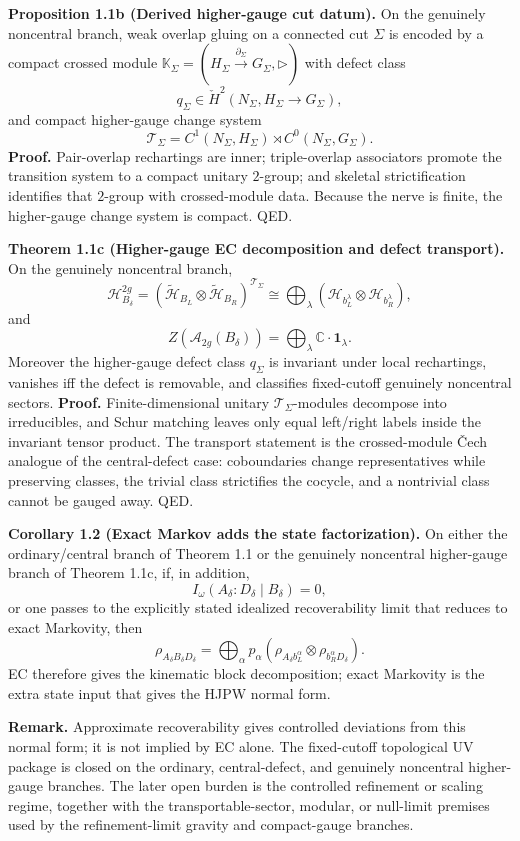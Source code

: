 \textbf{Proposition 1.1b (Derived higher-gauge cut datum).} On the genuinely noncentral branch, weak overlap gluing on a connected cut \(\Sigma\) is encoded by a compact crossed module \(\mathbb K_\Sigma=(H_\Sigma\xrightarrow{\partial_\Sigma}G_\Sigma,\triangleright)\) with defect class
\[
q_\Sigma\in \check H^2(N_\Sigma,H_\Sigma\to G_\Sigma),
\]
and compact higher-gauge change system
\[
\mathcal T_\Sigma=C^1(N_\Sigma,H_\Sigma)\rtimes C^0(N_\Sigma,G_\Sigma).
\]
\textbf{Proof.} Pair-overlap rechartings are inner; triple-overlap associators promote the transition system to a compact unitary \(2\)-group; and skeletal strictification identifies that \(2\)-group with crossed-module data. Because the nerve is finite, the higher-gauge change system is compact. QED.

\textbf{Theorem 1.1c (Higher-gauge EC decomposition and defect transport).} On the genuinely noncentral branch,
\[
\mathcal H_{B_\delta}^{2g}
=
(\tilde{\mathcal H}_{B_L}\otimes \tilde{\mathcal H}_{B_R})^{\mathcal T_\Sigma}
\cong
\bigoplus_\lambda
(\mathcal H_{b_L^\lambda}\otimes \mathcal H_{b_R^\lambda}),
\]
and
\[
Z(\mathcal A_{2g}(B_\delta))
=
\bigoplus_\lambda \mathbb C\cdot \mathbf 1_\lambda.
\]
Moreover the higher-gauge defect class \(q_\Sigma\) is invariant under local rechartings, vanishes iff the defect is removable, and classifies fixed-cutoff genuinely noncentral sectors.
\textbf{Proof.} Finite-dimensional unitary \(\mathcal T_\Sigma\)-modules decompose into
irreducibles, and Schur matching leaves only equal left/right labels inside the invariant tensor
product. The transport statement is the crossed-module \v{C}ech analogue of the central-defect
case: coboundaries change representatives while preserving classes, the trivial class strictifies
the cocycle, and a nontrivial class cannot be gauged away. QED.

\textbf{Corollary 1.2 (Exact Markov adds the state factorization).} On either the ordinary/central branch of Theorem 1.1 or the genuinely noncentral higher-gauge branch of Theorem 1.1c, if, in addition,
\[
I_\omega(A_\delta:D_\delta\mid B_\delta)=0,
\]
or one passes to the explicitly stated idealized recoverability limit that reduces to exact Markovity, then
\[
\rho_{A_\delta B_\delta D_\delta}
=
\bigoplus_\alpha p_\alpha
\left(\rho_{A_\delta b_L^\alpha}\otimes \rho_{b_R^\alpha D_\delta}\right).
\]
EC therefore gives the kinematic block decomposition; exact Markovity is the extra state input that gives the HJPW normal form.

\textbf{Remark.} Approximate recoverability gives controlled deviations from this normal form; it is not implied by EC alone. The fixed-cutoff topological UV package is closed on the ordinary, central-defect, and genuinely noncentral higher-gauge branches. The later open burden is the controlled refinement or scaling regime, together with the transportable-sector, modular, or null-limit premises used by the refinement-limit gravity and compact-gauge branches.
